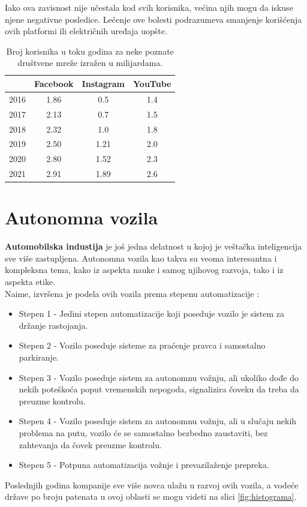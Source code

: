 \documentclass[a4paper]{article}
\begin{document}
Iako ova zavisnost nije učestala kod svih korisnika, većina njih mogu da iskuse njene negativne posledice. Lečenje ove bolesti podrazumeva smanjenje korišćenja ovih platformi ili električnih uređaja uopšte.


\begin{table}[h!]
\begin{center}

\begin{tabular}{|c|c|c|c|} \hline
 & Facebook & Instagram & YouTube\\ \hline
2016 & 1.86 & 0.5 & 1.4 \\ \hline
2017 & 2.13 & 0.7 & 1.5\\ \hline
2018 & 2.32 & 1.0 & 1.8 \\ \hline
2019 & 2.50 & 1.21 & 2.0 \\ \hline
2020 & 2.80 & 1.52 & 2.3 \\ \hline
2021 & 2.91 & 1.89 & 2.6 \\ \hline
\end{tabular}
\label{tab:tabela1}
\end{center}
\caption{Broj korisnika u toku godina za neke poznate društvene mreže izražen u milijardama.}
\end{table}
 


\section{Autonomna vozila}
\label{sec:Autonomna vozila}
\textbf{Automobilska industija} je još jedna delatnost u kojoj je veštačka inteligencija sve više zastupljena. Autonomna vozila kao takva su veoma interesantna i kompleksna tema, kako iz aspekta nauke i samog njihovog razvoja, tako i iz aspekta etike.\\
Naime, izvršena je podela ovih vozila prema stepenu automatizacije \cite{stepen_automonije}:
\begin{itemize}
 \item {Stepen 1 - Jedini stepen automatizacije koji poseduje vozilo je sistem za držanje rastojanja.}
 \item {Stepen 2 - Vozilo poseduje sisteme za praćenje pravca i samostalno parkiranje.}
 \item {Stepen 3 - Vozilo poseduje sistem za autonomnu vožnju, ali ukoliko dođe do nekih poteškoća poput vremenskih nepogoda, signalizira čoveku da treba da preuzme kontrolu.}
 \item {Stepen 4 - Vozilo poseduje sistem za autonomnu vožnju, ali u slučaju nekih problema na putu, vozilo će se samostalno bezbedno zaustaviti, bez zahtevanja da čovek preuzme kontrolu.}
 \item {Stepen 5 - Potpuna automatizacija vožnje i prevazilaženje prepreka.}
\end{itemize} 
Poslednjih godina kompanije sve više novca ulažu u razvoj ovih vozila, a vodeće države po broju patenata u ovoj oblasti se mogu videti na slici \ref{fig:histograma}.
\end{document}
